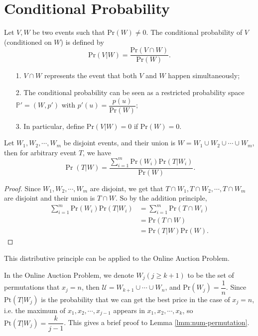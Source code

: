 \documentclass{scribe}
\theoremstyle{plain}
\theoremstyle{empty}
\begin{document}
\section{Conditional Probability}

\begin{definition}
    Let $V,W$ be two events such that $\text{Pr}(W)\neq 0$. The conditional probability of $V$ (conditioned on $W$) is defined by
    $$\text{Pr}(V|W)=\frac{\text{Pr}(V\cap W)}{\text{Pr}(W)}.$$
\end{definition}
\begin{remark} 
    \begin{itemize}
        \item[1.] $V\cap W$ represents the event that both $V$ and $W$ happen simultaneously;
        \item[2.] The conditional probability can be seen as a restricted probability space $\mathbb{P'}=(W,p')$ with $p'(u)=\dfrac{p(u)}{\text{Pr}(W)}$;
        \item[3.] In particular, define $\text{Pr}(V|W)=0$ if $\text{Pr}(W)=0$.
    \end{itemize}
\end{remark}

\begin{theorem}
    Let $W_1, W_2, \cdots, W_m$ be disjoint events, and their union is $W=W_1\cup W_2\cup\cdots\cup W_m$, then for arbitrary event $T$, we have 
    $$\Pr(T|W)=\frac{\sum_{i=1}^m\text{Pr}(W_i)\text{Pr}(T|W_i)}{\text{Pr}(W)}.$$ 
\end{theorem}

\begin{proof}
    Since $W_1,W_2,\cdots,W_m$ are disjoint, we get that $T\cap W_1,T\cap W_2,\cdots,T\cap W_m$ are disjoint and their union is $T\cap W$. So by the addition principle,
\begin{align*}
    \sum_{i=1}^m\text{Pr}(W_i)\text{Pr}(T|W_i) & = \sum_{i=1}^m \text{Pr}(T\cap W_i) \\
    &= \text{Pr}(T\cap W) \\
    &=\text{Pr}(T|W)\text{Pr}(W).
\end{align*}
\end{proof}

This distributive principle can be applied to the Online Auction Problem.

\begin{example}
    In the Online Auction Problem, we denote $W_j(j\ge k+1)$ to be the set of permutations that $x_j=n$, then $\mathcal{U}=W_{k+1}\cup \cdots\cup W_n$, and $\text{Pr}(W_j)=\dfrac{1}{n}$. Since $\text{Pt}(T|W_j)$ is the probability that we can get the best price in the case of $x_j=n$, i.e. the maximum of $x_1,x_2,\cdots,x_{j-1}$ appears in $x_1,x_2,\cdots,x_k$, so $\text{Pt}(T|W_j)=\dfrac{k}{j-1}$. This gives a brief proof to Lemma \ref{lmm:num-permutation}.
\end{example}
\end{document}
